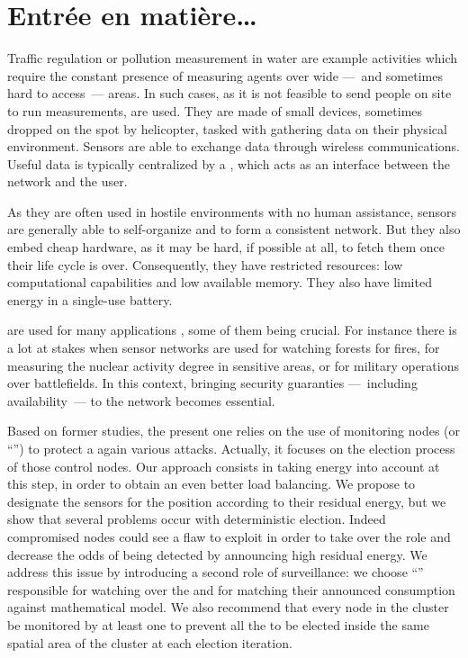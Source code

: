 \section{Entrée en matière…}
Traffic regulation or pollution measurement in water are example activities which require the constant presence of measuring agents over wide ---~and sometimes hard to access~--- areas.
In such cases, as it is not feasible to send people on site to run measurements, \wsns are used.
They are made of small devices, sometimes dropped on the spot by helicopter, tasked with gathering data on their physical environment.
Sensors are able to exchange data through wireless communications.
Useful data is typically centralized by a \bs, which acts as an interface between the network and the user.

As they are often used in hostile environments with no human assistance, sensors are generally able to self-organize and to form a consistent network.
But they also embed cheap hardware, as it may be hard, if possible at all, to fetch them once their life cycle is over.
Consequently, they have restricted resources: low computational capabilities and low available memory.
They also have limited energy%
in a single-use battery.

\wsns are used for many applications%
, some of them being crucial.
For instance there is a lot at stakes when sensor networks are used for watching forests for fires, for measuring the nuclear activity degree in sensitive areas, or for military operations over battlefields.
In this context, bringing security guaranties ---~including availability~--- to the network becomes essential.

Based on former studies, the present one relies on the use of monitoring nodes (or ``\cns'') to protect a \wsn again various \dos attacks.
Actually, it focuses on the election process of those control nodes.
Our approach consists in taking energy into account at this step, in order to obtain an even better load balancing.
We propose to designate the sensors for the \cn position according to their residual energy, but we show that several problems occur with deterministic election.
Indeed compromised nodes could see a flaw to exploit in order to take over the \cn role and decrease the odds of being detected by announcing high residual energy.
We address this issue by introducing a second role of surveillance: we choose ``\vns'' responsible for watching over the \cns and for matching their announced consumption against mathematical model.
We also recommend that every node in the cluster be monitored by at least one \cn to prevent all the \cns to be elected inside the same spatial area of the cluster at each election iteration.
